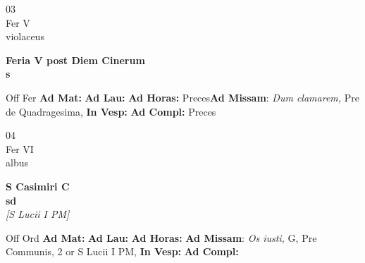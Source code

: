 \documentclass[10pt, openany]{book}
\begin{document}
        \begin{center}
            \begin{minipage}{3.5in}
                \vspace{2em}
                \begin{minipage}{0.5in}
                    {\Huge 03} \\
                    {\normalsize Fer V} \\
                    {\normalsize violaceus}
                \end{minipage}
                \begin{minipage}{3.0in}
                    \textbf{ \large Feria V post Diem Cinerum \\
                    \textnormal{\normalsize s}} \\ 
                \end{minipage}
                \begin{justify}Off Fer
                    \textbf{Ad Mat: }
                    \textbf{Ad Lau: }
                    \textbf{Ad Horas: }Preces\textbf{Ad Missam}: \textit{Dum clamarem,} Pre de Quadragesima,  
                    \textbf{In Vesp: }
                    \textbf{Ad Compl: }Preces
                \end{justify}
            \end{minipage}
        \end{center}
    
        \begin{center}
            \begin{minipage}{3.5in}
                \vspace{2em}
                \begin{minipage}{0.5in}
                    {\Huge 04} \\
                    {\normalsize Fer VI} \\
                    {\normalsize albus}
                \end{minipage}
                \begin{minipage}{3.0in}
                    \textbf{ \large S Casimiri C \\
                    \textnormal{\normalsize sd}} \\ \textit{[S Lucii I PM]} \\ 
                \end{minipage}
                \begin{justify}Off Ord
                    \textbf{Ad Mat: }
                    \textbf{Ad Lau: }
                    \textbf{Ad Horas: }\textbf{Ad Missam}: \textit{Os iusti,} G, Pre Communis, 2 or S Lucii I PM,  
                    \textbf{In Vesp: }
                    \textbf{Ad Compl: }
                \end{justify}
            \end{minipage}
        \end{center}
    
\end{document}
